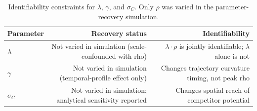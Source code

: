 \begin{table}[htbp]
\centering
\caption{Identifiability constraints for $\lambda$, $\gamma$, and $\sigma_C$. Only $\rho$ was varied in the parameter-recovery simulation.}
\label{tab:recovery-lambda-gamma}
\begin{tabular}{lrr}
\toprule
Parameter & Recovery status & Identifiability \\
\midrule
$\lambda$ & Not varied in simulation (scale-confounded with rho) & $\lambda \cdot \rho$ is jointly identifiable; $\lambda$ alone is not \\
$\gamma$ & Not varied in simulation (temporal-profile effect only) & Changes trajectory curvature timing, not peak rho \\
$\sigma_C$ & Not varied in simulation; analytical sensitivity reported & Changes spatial reach of competitor potential \\
\bottomrule
\end{tabular}
\end{table}
